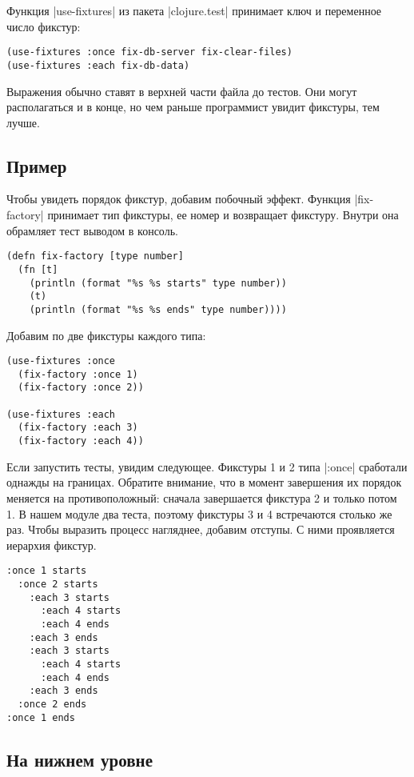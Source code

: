 Функция \spverb|use-fixtures| из пакета \spverb|clojure.test| принимает ключ и
переменное число фикстур:

\begin{verbatim}
(use-fixtures :once fix-db-server fix-clear-files)
(use-fixtures :each fix-db-data)
\end{verbatim}

Выражения обычно ставят в верхней части файла до тестов. Они могут располагаться
и в конце, но чем раньше программист увидит фикстуры, тем лучше.

\subsection{Пример}

Чтобы увидеть порядок фикстур, добавим побочный эффект. Функция
\spverb|fix-factory| принимает тип фикстуры, ее номер и возвращает
фикстуру. Внутри она обрамляет тест выводом в консоль.

\begin{verbatim}
(defn fix-factory [type number]
  (fn [t]
    (println (format "%s %s starts" type number))
    (t)
    (println (format "%s %s ends" type number))))
\end{verbatim}

Добавим по две фикстуры каждого типа:

\begin{verbatim}
(use-fixtures :once
  (fix-factory :once 1)
  (fix-factory :once 2))

(use-fixtures :each
  (fix-factory :each 3)
  (fix-factory :each 4))
\end{verbatim}

Если запустить тесты, увидим следующее. Фикстуры 1 и 2 типа \spverb|:once|
сработали однажды на границах. Обратите внимание, что в момент завершения их
порядок меняется на противоположный: сначала завершается фикстура 2 и только
потом 1. В нашем модуле два теста, поэтому фикстуры 3 и 4 встречаются столько же
раз. Чтобы выразить процесс нагляднее, добавим отступы. С ними проявляется
иерархия фикстур.

\begin{verbatim}
:once 1 starts
  :once 2 starts
    :each 3 starts
      :each 4 starts
      :each 4 ends
    :each 3 ends
    :each 3 starts
      :each 4 starts
      :each 4 ends
    :each 3 ends
  :once 2 ends
:once 1 ends
\end{verbatim}

\subsection{На нижнем уровне}

